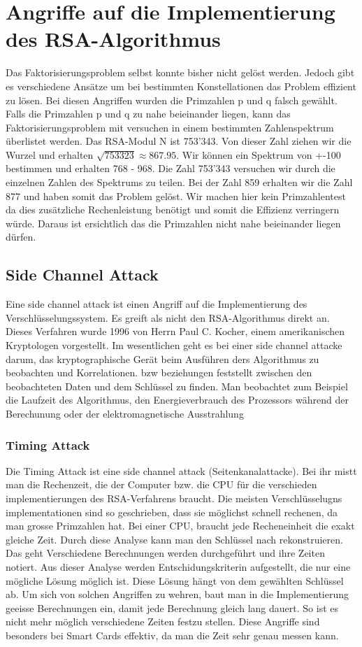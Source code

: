 \section{Angriffe auf die Implementierung des RSA-Algorithmus}
Das Faktorisierungsproblem selbst konnte bisher nicht gelöst werden. Jedoch gibt es verschiedene Ansätze um bei bestimmten Konstellationen das Problem effizient zu lösen. 
Bei diesen Angriffen wurden die Primzahlen p und q falsch gewählt.
Falls die Primzahlen p und q zu nahe beieinander liegen, kann das Faktorisierungsproblem mit versuchen in einem bestimmten Zahlenspektrum überlistet werden. Das RSA-Modul N ist 753'343. Von dieser Zahl ziehen wir die Wurzel und erhalten $ \sqrt{753323} \approx 867.95 $. Wir können  ein Spektrum von +-100 bestimmen und erhalten 768 - 968. Die Zahl 753'343 versuchen wir durch die einzelnen Zahlen des Spektrums zu teilen. Bei der Zahl 859 erhalten wir die Zahl 877 und haben somit das Problem gelöst. Wir machen hier kein Primzahlentest da dies zusätzliche Rechenleistung benötigt und somit die Effizienz verringern würde. Daraus ist ersichtlich das die Primzahlen nicht nahe beieinander liegen dürfen.%
%
\subsection{Side Channel Attack}
Eine side channel attack ist einen Angriff auf die Implementierung des Verschlüsselungssystem. Es greift als nicht den RSA-Algorithmus direkt an.
Dieses Verfahren wurde 1996 von Herrn Paul C. Kocher, einem amerikanischen Kryptologen vorgestellt.
Im wesentlichen geht es bei einer side channel attacke darum, das kryptographische Gerät beim Ausführen ders Algorithmus zu beobachten und Korrelationen. bzw beziehungen feststellt zwischen den beobachteten Daten und dem Schlüssel zu finden.
Man beobachtet zum Beispiel die Laufzeit des Algorithmus, den Energieverbrauch des Prozessors während der Berechunung oder der elektromagnetische Ausstrahlung
%
\subsubsection{Timing Attack}
Die Timing Attack ist eine side channel attack (Seitenkanalattacke). 
Bei ihr mistt man die Rechenzeit, die der Computer bzw. die CPU für die verschieden implementierungen des RSA-Verfahrens braucht. Die meisten Verschlüsselugns implementationen sind so geschrieben, dass sie möglichst schnell rechenen, da man grosse Primzahlen hat. Bei einer CPU, braucht jede Recheneinheit die exakt gleiche Zeit. Durch diese Analyse kann man den Schlüssel nach rekonstruieren. Das geht 
%
Verschiedene Berechnungen werden durchgeführt und ihre Zeiten notiert. Aus dieser Analyse werden Entschidungskriterin aufgestellt, die nur eine mögliche Lösung möglich ist. Diese Lösung hängt von dem gewählten Schlüssel ab.
%
Um sich von solchen Angriffen zu wehren, baut man in die Implementierung geeisse Berechnungen ein, damit jede Berechnung gleich lang dauert. So ist es nicht mehr möglich verschiedene Zeiten festzu stellen.
%
Diese Angriffe sind besonders bei Smart Cards effektiv, da man die Zeit sehr genau messen kann.
%

